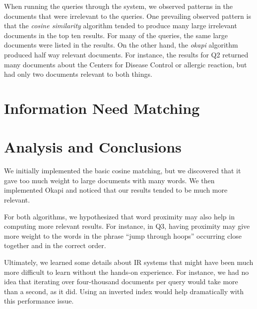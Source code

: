 \documentclass{report}
\begin{document}
When running the queries through the system, we observed patterns in
the documents that were irrelevant to the queries. One prevailing
observed pattern is that the \textit{cosine similarity} algorithm
tended to produce many large irrelevant documents in the top ten
results. For many of the queries, the same large documents were listed
in the results. On the other hand, the \textit{okapi} algorithm
produced half way relevant documents. For instance, the results for Q2
returned many documents about the Centers for Disease Control or
allergic reaction, but had only two documents relevant to both things.

\section{Information Need Matching}

\section{Analysis and Conclusions}
We initially implemented the basic cosine matching, but we discovered
that it gave too much weight to large documents with many words. We
then implemented Okapi and noticed that our results tended to be much
more relevant.

For both algorithms, we hypothesized that word proximity may also help
in computing more relevant results. For instance, in Q3, having
proximity may give more weight to the words in the phrase ``jump
through hoops'' occurring close together and in the correct order.

Ultimately, we learned some details about IR systems that might have
been much more difficult to learn without the hands-on experience. For
instance, we had no idea that iterating over four-thousand documents
per query would take more than a second, as it did. Using an inverted
index would help dramatically with this performance issue.
\end{document}
